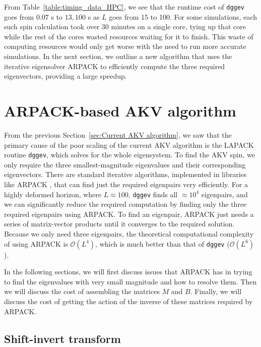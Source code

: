 \documentclass{iopjournal}
\begin{document}
From Table~\ref{table:timing_data_HPC}, we see that the runtime cost of \texttt{dggev} goes from $0.07$ s to $13{,}100$ s as $L$ goes from 15 to 100.
For some simulations, each such spin calculation took over 30 minutes on a single core, tying up that core while the rest of the cores wasted resources waiting for it to finish. This waste of computing resources would only get worse with the need to run more accurate simulations. In the next section, we outline a new algorithm that uses the iterative eigensolver ARPACK to efficiently compute the three required eigenvectors, providing a large speedup.

\section{\label{sec:Sparse AKV algorithm} ARPACK-based AKV algorithm}

From the previous Section~\ref{sec:Current AKV algorithm}, we saw that the primary cause of the poor scaling of the current AKV algorithm is the LAPACK routine \texttt{dggev}, which solves for the whole eigensystem. To find the AKV spin, we only require the three smallest-magnitude eigenvalues and their corresponding eigenvectors. There are standard iterative algorithms, implemented in libraries like ARPACK \cite{arpack_guide}, that can find just the required eigenpairs very efficiently. For a highly deformed horizon, where $L\approx100$, \texttt{dggev} finds all $\approx 10^4$ eigenpairs, and we can significantly reduce the required computation by finding only the three required eigenpairs using ARPACK. To find an eigenpair, ARPACK just needs a series of matrix-vector products until it converges to the required solution. Because we only need three eigenpairs, the theoretical computational complexity of using ARPACK is $\mathcal{O}(L^4)$, which is much better than that of \texttt{dggev} ($\mathcal{O}(L^6)$).

In the following sections, we will first discuss issues that ARPACK has in trying to find the eigenvalues with very small magnitude and how to resolve them. Then we will discuss the cost of assembling the matrices $M$ and $B$. Finally, we will discuss the cost of getting the action of the inverse of these matrices required by ARPACK.

\subsection{\label{ssec:Shift Invert transform} Shift-invert transform}
\end{document}
